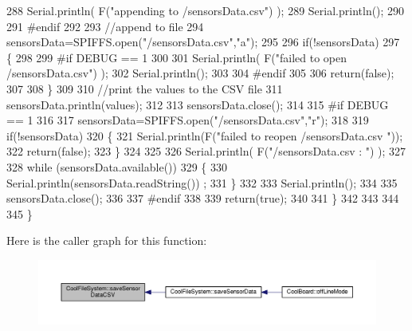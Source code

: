 \begin{DoxyCode}
288         Serial.println( F(\textcolor{stringliteral}{"appending to /sensorsData.csv"}) );
289         Serial.println();
290     
291 \textcolor{preprocessor}{    #endif}
292 
293         \textcolor{comment}{//append to file}
294         sensorsData=SPIFFS.open(\textcolor{stringliteral}{"/sensorsData.csv"},\textcolor{stringliteral}{"a"});
295         
296         \textcolor{keywordflow}{if}(!sensorsData)
297         \{
298         
299 \textcolor{preprocessor}{        #if DEBUG == 1}
300             
301             Serial.println( F(\textcolor{stringliteral}{"failed to open /sensorsData.csv"}) );
302             Serial.println();
303 
304 \textcolor{preprocessor}{        #endif}
305             
306             \textcolor{keywordflow}{return}(\textcolor{keyword}{false});
307         
308         \}
309 
310         \textcolor{comment}{//print the values to the CSV file}
311         sensorsData.println(values);
312         
313         sensorsData.close();
314 
315 \textcolor{preprocessor}{    #if DEBUG == 1}
316 
317         sensorsData=SPIFFS.open(\textcolor{stringliteral}{"/sensorsData.csv"},\textcolor{stringliteral}{"r"});
318         
319         \textcolor{keywordflow}{if}(!sensorsData)
320         \{
321             Serial.println(F(\textcolor{stringliteral}{"failed to reopen /sensorsData.csv "}));
322             \textcolor{keywordflow}{return}(\textcolor{keyword}{false});      
323         \}
324 
325         
326         Serial.println( F(\textcolor{stringliteral}{"/sensorsData.csv : "}) );
327 
328         \textcolor{keywordflow}{while} (sensorsData.available()) 
329         \{
330             Serial.println(sensorsData.readString()) ;
331         \}
332         
333         Serial.println();
334         
335         sensorsData.close();
336         
337 \textcolor{preprocessor}{    #endif      }
338         
339         \textcolor{keywordflow}{return}(\textcolor{keyword}{true});
340     
341     \}   
342 
343 
344 
345 \}
\end{DoxyCode}
Here is the caller graph for this function\+:\nopagebreak
\begin{figure}[H]
\begin{center}
\leavevmode
\includegraphics[width=350pt]{db/d0c/class_cool_file_system_ab78704d5d21ce10fc6f1138ab5ab46c8_icgraph}
\end{center}
\end{figure}
\mbox{\label{class_cool_file_system_adfa8e2e80641ae6f0cceabd348a9b841}} 
